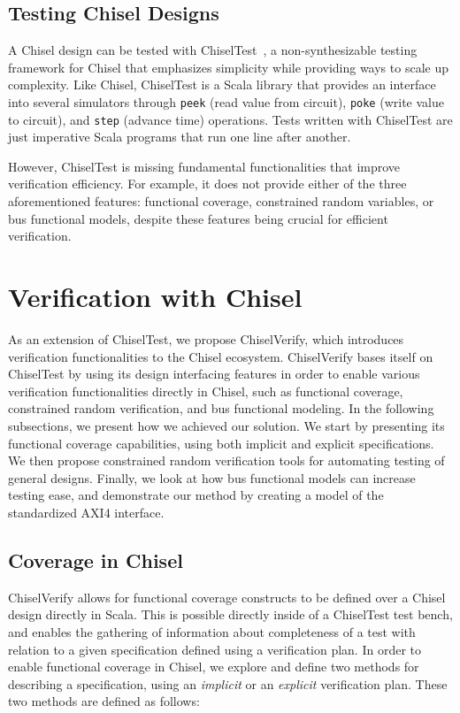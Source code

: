 \documentclass[conference]{IEEEtran}
\begin{document}
\subsection{Testing Chisel Designs}
A Chisel design can be tested with ChiselTest~\cite{chiseltest}, a non-synthesizable 
testing framework for Chisel that emphasizes simplicity while providing ways to scale up 
complexity. Like Chisel, ChiselTest is a Scala library that provides an interface into several 
simulators through \texttt{peek} (read value from circuit), \texttt{poke} (write value to 
circuit), and \texttt{step} (advance time) operations. Tests written with ChiselTest are just 
imperative Scala programs that run one line after another.

However, ChiselTest is missing fundamental functionalities that improve verification efficiency. 
For example, it does not provide either of the three aforementioned features: functional 
coverage, constrained random variables, or bus functional models, despite these features being 
crucial for efficient verification.

\section{Verification with Chisel}
\label{sec:verify}

As an extension of ChiselTest, we propose ChiselVerify, which introduces verification functionalities to the Chisel ecosystem.
ChiselVerify bases itself on ChiselTest by using its design interfacing features in order to enable various verification functionalities directly in Chisel, such as functional coverage, constrained random verification, and bus functional modeling. 
In the following subsections, we present how we achieved our solution.
We start by presenting its functional coverage capabilities,  using both implicit and explicit specifications.
We then propose constrained random verification tools for automating testing of general designs.
Finally, we look at how bus functional models can increase testing ease, and demonstrate our method by creating a model of the standardized AXI4 interface. 


\subsection{Coverage in Chisel}
ChiselVerify allows for functional coverage constructs to be defined over a Chisel design directly in Scala. 
This is possible directly inside of a ChiselTest test bench, and enables the gathering of information about completeness of a test with relation to a given specification defined using a verification plan.
In order to enable functional coverage in Chisel, we explore and define two methods for describing a specification, using an \emph{implicit} or an \emph{explicit} verification plan.
These two methods are defined as follows:
\end{document}
